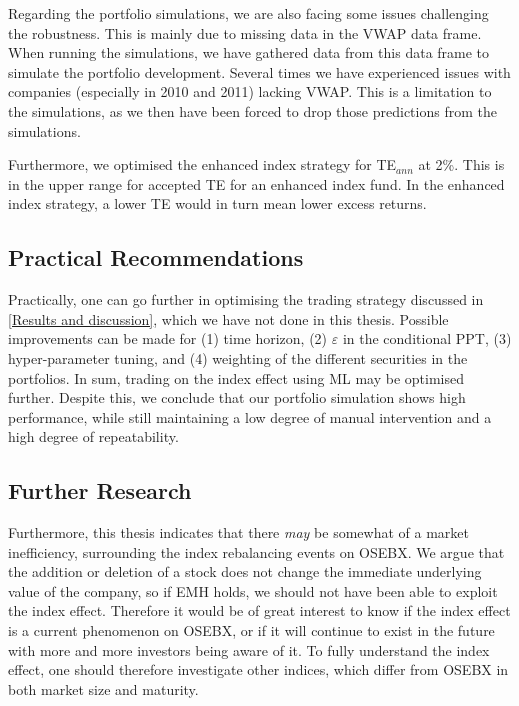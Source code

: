 Regarding the portfolio simulations, we are also facing some issues challenging the robustness. This is mainly due to missing data in the VWAP data frame. When running the simulations, we have gathered data from this data frame to simulate the portfolio development. Several times we have experienced issues with companies (especially in 2010 and 2011) lacking VWAP. This is a limitation to the simulations, as we then have been forced to drop those predictions from the simulations.

Furthermore, we optimised the enhanced index strategy for TE$_{ann}$ at 2\%. This is in the upper range for accepted TE for an enhanced index fund. In the enhanced index strategy, a lower TE would in turn mean lower excess returns. 

\subsection{Practical Recommendations}

Practically, one can go further in optimising the trading strategy discussed in \autoref{Results and discussion}, which we have not done in this thesis. Possible improvements can be made for (1) time horizon, (2) $\varepsilon$ in the conditional PPT, (3) hyper-parameter tuning, and (4) weighting of the different securities in the portfolios. In sum, trading on the index effect using ML may be optimised further. Despite this, we conclude that our portfolio simulation shows high performance, while still maintaining a low degree of manual intervention and a high degree of repeatability. 


\subsection{Further Research}

Furthermore, this thesis indicates that there \textit{may} be somewhat of a market inefficiency, surrounding the index rebalancing events on OSEBX. We argue that the addition or deletion of a stock does not change the immediate underlying value of the company, so if EMH holds, we should not have been able to exploit the index effect. Therefore it would be of great interest to know if the index effect is a current phenomenon on OSEBX, or if it will continue to exist in the future with more and more investors being aware of it. To fully understand the index effect, one should therefore investigate other indices, which differ from OSEBX in both market size and maturity. 



